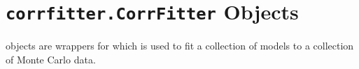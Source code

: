 \documentclass[letterpaper,10pt,english]{sphinxmanual}
\begin{document}
\begin{fulllineitems}
\begin{fulllineitems}
\begin{quote}
\begin{description}
\begin{itemize}
\end{itemize}

\end{description}\end{quote}

\end{fulllineitems}


\end{fulllineitems}



\section{\texttt{corrfitter.CorrFitter} Objects}
\label{corrfitter:corrfitter-objects}
{\hyperref[corrfitter:corrfitter.CorrFitter]{}} objects are wrappers for  which
is used to fit a collection of models to a collection of Monte Carlo data.
\end{document}

